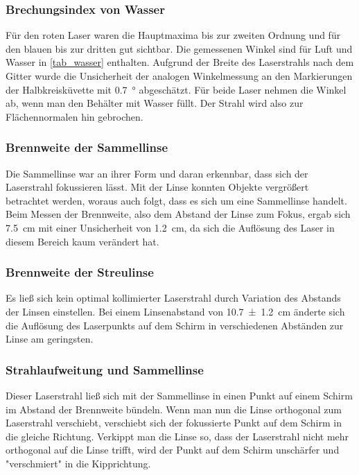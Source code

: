 \documentclass[
	a4paper,
	12pt,
	pagesize,
	ngerman
]{scrartcl}
\begin{document}
	\subsubsection{Brechungsindex von Wasser}
	Für den roten Laser waren die Hauptmaxima bis zur zweiten Ordnung und für den blauen bis zur dritten gut sichtbar.
	Die gemessenen Winkel sind für Luft und Wasser in \cref{tab_wasser} enthalten.
	Aufgrund der Breite des Laserstrahls nach dem Gitter wurde die Unsicherheit der analogen Winkelmessung an den Markierungen der Halbkreisküvette mit \SI{0,7}{\degree} abgeschätzt.
	Für beide Laser nehmen die Winkel ab, wenn man den Behälter mit Wasser füllt.
	Der Strahl wird also zur Flächennormalen hin gebrochen.
	\subsubsection{Brennweite der Sammellinse}
	Die Sammellinse war an ihrer Form und daran erkennbar, dass sich der Laserstrahl fokussieren lässt.
	Mit der Linse konnten Objekte vergrößert betrachtet werden, woraus auch folgt, dass es sich um eine Sammellinse handelt.%
	Beim Messen der Brennweite, also dem Abstand der Linse zum Fokus, ergab sich \SI{7,5}{cm} mit einer Unsicherheit von \SI{1,2}{cm}, da sich die Auflösung des Laser in diesem Bereich kaum verändert hat. 
	\subsubsection{Brennweite der Streulinse}
	Es ließ sich kein optimal kollimierter Laserstrahl durch Variation des Abstands der Linsen einstellen.
	Bei einem Linsenabstand von \SI{10,7 +- 1,2}{cm} änderte sich die Auflösung des Laserpunkts auf dem Schirm in verschiedenen Abständen zur Linse am geringsten.
	\subsubsection{Strahlaufweitung und Sammellinse}
	Dieser Laserstrahl ließ sich mit der Sammellinse in einen Punkt auf einem Schirm im Abstand der Brennweite bündeln.
	Wenn man nun die Linse orthogonal zum Laserstrahl verschiebt, verschiebt sich der fokussierte Punkt auf dem Schirm in die gleiche Richtung.
	Verkippt man die Linse so, dass der Laserstrahl nicht mehr orthogonal auf die Linse trifft, wird der Punkt auf dem Schirm unschärfer und "verschmiert" in die Kipprichtung.

\end{document}
